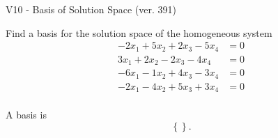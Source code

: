 \begin{exercise}
  \begin{exerciseTitle}V10 - Basis of Solution Space (ver. 391)\end{exerciseTitle}
  \begin{exerciseStatement}
    Find a basis for the solution space of the homogeneous system 
\begin{align*}
 -2 x_ 1 + 5 x_ 2 + 2 x_ 3 -5 x_ 4 &= 0  \\ 
  3 x_ 1 + 2 x_ 2 -2 x_ 3 -4 x_ 4 &= 0  \\ 
  -6 x_ 1 -1 x_ 2 + 4 x_ 3 -3 x_ 4 &= 0  \\ 
  -2 x_ 1 -4 x_ 2 + 5 x_ 3 + 3 x_ 4 &= 0  \\ 
 \end{align*}


 
  \end{exerciseStatement}

  \begin{exerciseAnswer}
   A basis is   
\[\left\{\right\}.\]

  


  \end{exerciseAnswer}
\end{exercise}